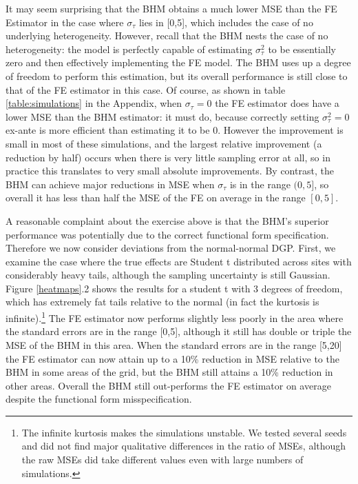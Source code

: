 \documentclass[12pt]{article}
\begin{document}
It may seem surprising that the BHM obtains a much lower MSE than the FE Estimator in the case where $\sigma_{\tau}$ lies in [0,5], which includes the case of no underlying heterogeneity. However, recall that the BHM nests the case of no heterogeneity: the model is perfectly capable of estimating $\sigma^2_{\tau}$ to be essentially zero and then effectively implementing the FE model. The BHM uses up a degree of freedom to perform this estimation, but its overall performance is still close to that of the FE estimator in this case. Of course, as shown in table \ref{table:simulations} in the Appendix, when $\sigma_{\tau} = 0$ the FE estimator does have a lower MSE than the BHM estimator: it must do, because correctly setting $\sigma^2_{\tau} = 0$ ex-ante is more efficient than estimating it to be 0. However the improvement is small in most of these simulations, and the largest relative improvement (a reduction by half) occurs when there is very little sampling error at all, so in practice this translates to very small absolute improvements. By contrast, the BHM can achieve major reductions in MSE when $\sigma_{\tau}$ is in the range $(0,5]$, so overall it has less than half the MSE of the FE on average in the range $[0,5]$.

A reasonable complaint about the exercise above is that the BHM's superior performance was potentially due to the correct functional form specification. Therefore we now consider deviations from the normal-normal DGP. First, we examine the case where the true effects are Student t distributed across sites with considerably heavy tails, although the sampling uncertainty is still Gaussian. Figure \ref{heatmaps}.2 shows the results for a student t with 3 degrees of freedom, which has extremely fat tails relative to the normal (in fact the kurtosis is infinite).\footnote{The infinite kurtosis makes the simulations unstable. We tested several seeds and did not find major qualitative differences in the ratio of MSEs, although the raw MSEs did take different values even with large numbers of simulations.} The FE estimator now performs slightly less poorly in the area where the standard errors are in the range [0,5], although it still has double or triple the MSE of the BHM in this area. When the standard errors are in the range [5,20] the FE estimator can now attain up to a 10\% reduction in MSE relative to the BHM in some areas of the grid, but the BHM still attains a 10\% reduction in other areas. Overall the BHM still out-performs the FE estimator on average despite the functional form misspecification.
\end{document}
